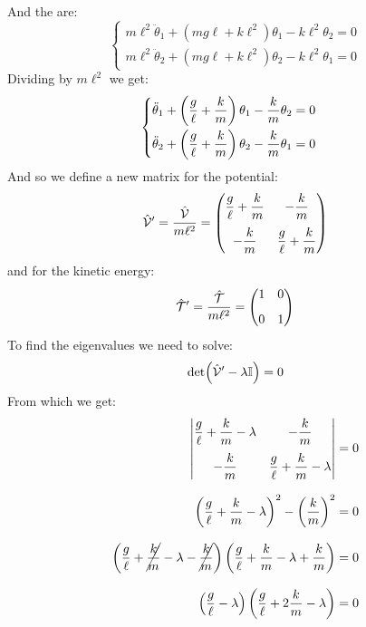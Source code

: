 And the \eleref\;are:
\begin{equation}
    \begin{cases}
        m\ell^2\ddot{\theta}_1 + (mg\ell + k\ell^2)\theta_1 - k\ell^2\theta_2 = 0\\[8pt]
        m\ell^2\ddot{\theta}_2 + (mg\ell + k\ell^2)\theta_2 - k\ell^2\theta_1 = 0
    \end{cases}
\end{equation}
Dividing by $m\ell^2$ we get:
\begin{equation} \label{e:ode_system_double_pendulum}
    \begin{cases}
        \ddot{\theta}_1 + \left(\dfrac{g}{\ell} + \dfrac{k}{m}\right)\theta_1 - \dfrac{k}{m}\theta_2 = 0\\[8pt]
        \ddot{\theta}_2 + \left(\dfrac{g}{\ell} + \dfrac{k}{m}\right)\theta_2 - \dfrac{k}{m}\theta_1 = 0
    \end{cases}
\end{equation}
And so we define a new matrix for the potential:
\begin{equation}
    \hat{\mathcal{V}}' = \dfrac{\hat{\mathcal{V}}}{m\ell^2}=\begin{pmatrix}
        \dfrac{g}{\ell} + \dfrac{k}{m} & - \dfrac{k}{m}\\[10pt]
        - \dfrac{k}{m} & \dfrac{g}{\ell} + \dfrac{k}{m}
    \end{pmatrix}
\end{equation}
and for the kinetic energy:
\begin{equation}
    \hat{\mathcal{T}}' = \dfrac{\hat{\mathcal{T}}}{m\ell^2}=\begin{pmatrix}
        1 & 0\\[8pt]
        0 & 1
    \end{pmatrix}
\end{equation}
To find the eigenvalues we need to solve:
\begin{equation}
    \det(\hat{\mathcal{V}}'-\lambda\mathbb{I}) = 0
\end{equation}
From which we get:
\begin{equation}
    \begin{split}
        \begin{vmatrix}
            \dfrac{g}{\ell} + \dfrac{k}{m} - \lambda & - \dfrac{k}{m}\\[10pt]
            - \dfrac{k}{m} & \dfrac{g}{\ell} + \dfrac{k}{m} - \lambda
        \end{vmatrix} &= 0\\[8pt]
        \left(\dfrac{g}{\ell} + \dfrac{k}{m} - \lambda\right)^2 -\left(\dfrac{k}{m}\right)^2 & = 0\\[8pt]
        \left(\dfrac{g}{\ell} + \cancel{\dfrac{k}{m}} - \lambda-\cancel{\dfrac{k}{m}}\right)\left(\dfrac{g}{\ell} + \dfrac{k}{m} - \lambda+\dfrac{k}{m}\right) &=0\\[8pt]
        \left(\dfrac{g}{\ell} - \lambda\right)\left(\dfrac{g}{\ell} + 2\dfrac{k}{m} - \lambda\right) &=0
    \end{split}
\end{equation}
